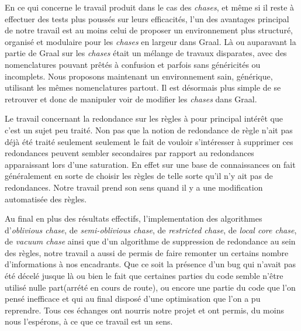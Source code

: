 \par En ce qui concerne le travail produit dans le cas des \textit{chases}, et même si il reste à effectuer des tests plus poussés sur leurs efficacités, l'un des avantages principal de notre travail est au moins celui de proposer un environnement plus structuré, organisé et modulaire pour les \textit{chases} en largeur dans Graal. Là ou auparavant la partie de Graal sur les \textit{chases} était un mélange de travaux disparates, avec des nomenclatures pouvant prêtés à confusion et parfois sans généricités ou incomplets. Nous proposons maintenant un environnement sain, générique, utilisant les mêmes nomenclatures partout. Il est désormais plus simple de se retrouver et donc de manipuler voir de modifier les \textit{chases} dans Graal.

\par Le travail concernant la redondance sur les règles à pour principal intérêt que c'est un sujet peu traité. Non pas que la notion de redondance de règle n'ait pas déjà été traité seulement seulement le fait de vouloir s'intéresser à supprimer ces redondances peuvent sembler secondaires par rapport au redondances apparaissant lors d'une saturation. En effet sur une base de connaissances on fait généralement en sorte de choisir les règles de telle sorte qu'il n'y ait pas de redondances. Notre travail prend son sens quand il y a une modification automatisée des règles.

\par Au final en plus des résultats effectifs, l'implementation des algorithmes d'\textit{oblivious chase}, de \textit{semi-oblivious chase}, de \textit{restricted chase}, de \textit{local core chase}, de \textit{vacuum chase} ainsi que d'un algorithme de suppression de redondance au sein des règles, notre travail a aussi de permis de faire remonter un certains nombre d'informations à nos encadrants. Que ce soit la présence d'un bug qui n'avait pas été décelé jusque là ou bien le fait que certaines parties du code semble n'être utilisé nulle part(arrété en cours de route), ou encore une partie du code que l'on pensé inefficace et qui au final disposé d'une optimisation que l'on a pu reprendre. Tous ces échanges ont nourris notre projet et ont permis, du moins nous l'espérons, à ce que ce travail est un sens.


